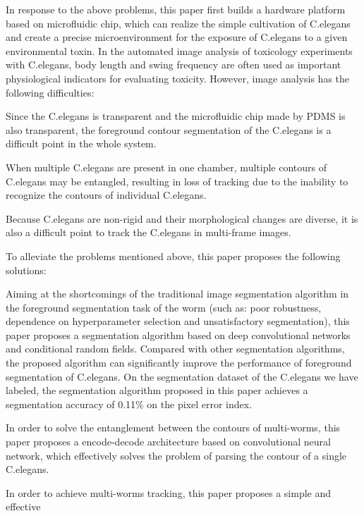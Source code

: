 \begin{englishabstract}
	In response to the above problems,
	this paper first builds a hardware platform based on microfluidic chip, 
	which can realize the simple cultivation of C.elegans and create 
	a precise microenvironment for the exposure of C.elegans to a
	given environmental toxin.
	In the automated image analysis of toxicology experiments with C.elegans, 
	body length and swing frequency are often used as important physiological indicators
	for evaluating toxicity. However, image analysis has the following difficulties:
	\begin{enumerate*}[label=\itshape\alph*)\upshape]\quad
	\item Since the C.elegans is transparent and the microfluidic chip made by PDMS is also transparent, 
	the foreground contour segmentation of the C.elegans is a difficult point in the whole system.\quad
	\item When multiple C.elegans are present in one chamber, multiple contours of C.elegans may be
	entangled, resulting in loss of tracking due to the inability to recognize the contours of individual C.elegans.\quad
	\item Because C.elegans are non-rigid and their morphological changes are diverse, 
	it is also a difficult point to track the C.elegans in multi-frame images.\quad
	\end{enumerate*}
	To alleviate the problems mentioned above, this paper proposes the following solutions:
	\begin{enumerate*}[label=\itshape\alph*)\upshape]\quad
	\item Aiming at the shortcomings of the traditional image segmentation algorithm 
	in the foreground segmentation task of the worm (such as: poor robustness, 
	dependence on hyperparameter selection and unsatisfactory segmentation), this paper proposes a segmentation algorithm 
	based on deep convolutional networks and conditional random fields. Compared with other segmentation algorithms, 
	the proposed algorithm can significantly improve the performance of  foreground segmentation of C.elegans.
	On the segmentation dataset of the C.elegans we have labeled, 
	the segmentation algorithm proposed in this paper achieves 
	a segmentation accuracy of 0.11\% on the pixel error index.\quad
	\item In order to solve the entanglement between the contours of multi-worms, 
	this paper proposes a encode-decode architecture based on convolutional neural network, 
	which effectively solves the problem of parsing the contour of a single C.elegans.\quad
	\item In order to achieve multi-worms tracking, this paper proposes a simple and effective 

\end{enumerate*}
\end{englishabstract}
